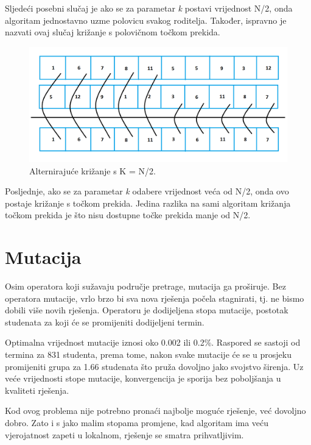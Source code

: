\documentclass[times, utf8, zavrsni]{fer}
\begin{document}
Sljedeći posebni slučaj je ako se za parametar \emph{k} postavi vrijednost N/2, onda algoritam jednostavno uzme polovicu svakog roditelja. Također, ispravno je nazvati ovaj slučaj križanje s polovičnom točkom prekida.

\begin{figure}[htb]
\centering
\includegraphics[width=14cm]{images/half_cross.png}
\caption{Alternirajuće križanje s K = N/2.}
\label{fig:half_cross}
\end{figure}

\newpage

Posljednje, ako se za parametar \emph{k} odabere vrijednost veća od N/2, onda ovo postaje križanje s točkom prekida. Jedina razlika na sami algoritam križanja točkom prekida je što nisu dostupne točke prekida manje od N/2.

\section{Mutacija}

Osim operatora koji sužavaju područje pretrage, mutacija ga proširuje. Bez operatora mutacije, vrlo brzo bi sva nova rješenja počela stagnirati, tj. ne bismo dobili više novih rješenja. Operatoru je dodijeljena stopa mutacije, postotak studenata za koji će se promijeniti dodijeljeni termin.

Optimalna vrijednost mutacije  iznosi oko 0.002 ili 0.2\%. Raspored se sastoji od termina za 831 studenta, prema tome, nakon svake mutacije će se u prosjeku promijeniti grupa za 1.66 studenata što pruža dovoljno jako svojstvo širenja. Uz veće vrijednosti stope mutacije, konvergencija je sporija bez poboljšanja u kvaliteti rješenja.

Kod ovog problema nije potrebno pronaći najbolje moguće rješenje, već dovoljno dobro. Zato i s jako malim stopama promjene, kad algoritam ima veću vjerojatnost zapeti u lokalnom, rješenje se smatra prihvatljivim.
\end{document}
